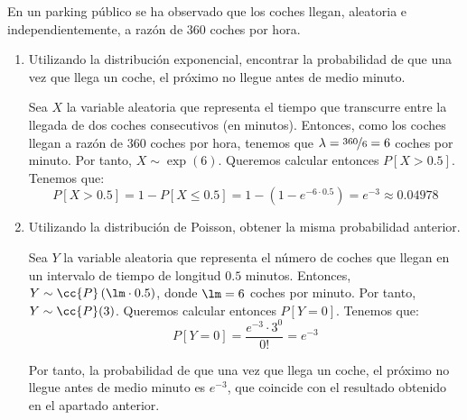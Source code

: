 \begin{ejercicio}
    En un parking público se ha observado que los coches llegan, aleatoria e independientemente, a razón de $360$ coches por hora.
    \begin{enumerate}
        \item Utilizando la distribución exponencial, encontrar la probabilidad de que una vez que llega un coche, el próximo no llegue antes de medio minuto.
        
        Sea $X$ la variable aleatoria que representa el tiempo que transcurre entre la llegada de dos coches consecutivos (en minutos). Entonces, como los coches llegan a razón de $360$ coches por hora, tenemos que $\lambda = \nicefrac{360}{6} = 6$ coches por minuto. Por tanto, $X\sim \exp(6)$.
        Queremos calcular entonces $P[X>0.5]$. Tenemos que:
        \begin{equation*}
            P[X>0.5] = 1-P[X\leq 0.5] = 1-(1-e^{-6\cdot 0.5}) = e^{-3} \approx 0.04978
        \end{equation*}

        \item Utilizando la distribución de Poisson, obtener la misma probabilidad anterior.
        
        Sea $Y$ la variable aleatoria que representa el número de coches que llegan en un intervalo de tiempo de longitud $0.5$ minutos. Entonces, $Y\sim \cc{P}\left(\lm\cdot 0.5\right)$, donde $\lm = 6$ coches por minuto. Por tanto, $Y\sim \cc{P}(3)$.
        Queremos calcular entonces $P[Y=0]$. Tenemos que:
        \begin{equation*}
            P[Y=0] = \dfrac{e^{-3}\cdot 3^0}{0!} = e^{-3}
        \end{equation*}

        Por tanto, la probabilidad de que una vez que llega un coche, el próximo no llegue antes de medio minuto es $e^{-3}$, que coincide con el resultado obtenido en el apartado anterior.
    \end{enumerate}
\end{ejercicio}

